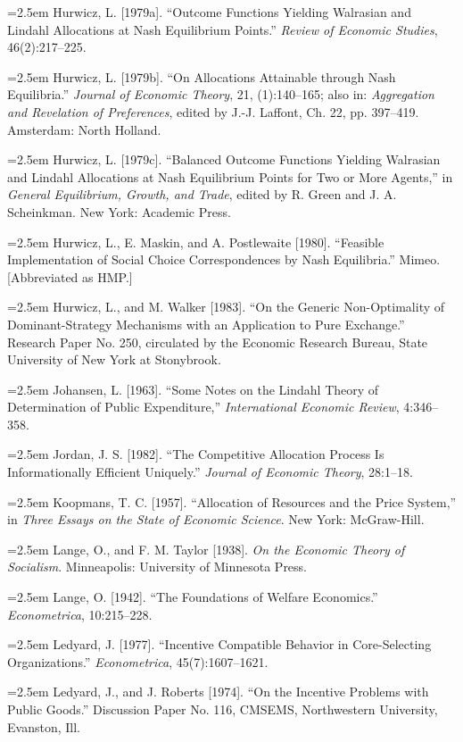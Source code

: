 \documentclass[12pt, letterpaper]{article}
\newcommand{\bibentry}[1]{\noindent\hangindent=2.5em\hangafter=1 \small #1 \par\vspace{0.75em}}
\begin{document}
\bibentry{Hurwicz, L. [1979a]. ``Outcome Functions Yielding Walrasian and Lindahl Allocations at Nash Equilibrium Points.'' \textit{Review of Economic Studies}, 46(2):217--225.}

\bibentry{Hurwicz, L. [1979b]. ``On Allocations Attainable through Nash Equilibria.'' \textit{Journal of Economic Theory}, 21, (1):140--165; also in: \textit{Aggregation and Revelation of Preferences}, edited by J.-J. Laffont, Ch. 22, pp. 397--419. Amsterdam: North Holland.}

\bibentry{Hurwicz, L. [1979c]. ``Balanced Outcome Functions Yielding Walrasian and Lindahl Allocations at Nash Equilibrium Points for Two or More Agents,'' in \textit{General Equilibrium, Growth, and Trade}, edited by R. Green and J. A. Scheinkman. New York: Academic Press.}

\bibentry{Hurwicz, L., E. Maskin, and A. Postlewaite [1980]. ``Feasible Implementation of Social Choice Correspondences by Nash Equilibria.'' Mimeo. [Abbreviated as HMP.]}

\bibentry{Hurwicz, L., and M. Walker [1983]. ``On the Generic Non-Optimality of Dominant-Strategy Mechanisms with an Application to Pure Exchange.'' Research Paper No. 250, circulated by the Economic Research Bureau, State University of New York at Stonybrook.}

\bibentry{Johansen, L. [1963]. ``Some Notes on the Lindahl Theory of Determination of Public Expenditure,'' \textit{International Economic Review}, 4:346--358.}

\bibentry{Jordan, J. S. [1982]. ``The Competitive Allocation Process Is Informationally Efficient Uniquely.'' \textit{Journal of Economic Theory}, 28:1--18.}

\bibentry{Koopmans, T. C. [1957]. ``Allocation of Resources and the Price System,'' in \textit{Three Essays on the State of Economic Science}. New York: McGraw-Hill.}

\bibentry{Lange, O., and F. M. Taylor [1938]. \textit{On the Economic Theory of Socialism}. Minneapolis: University of Minnesota Press.}

\bibentry{Lange, O. [1942]. ``The Foundations of Welfare Economics.'' \textit{Econometrica}, 10:215--228.}

\bibentry{Ledyard, J. [1977]. ``Incentive Compatible Behavior in Core-Selecting Organizations.'' \textit{Econometrica}, 45(7):1607--1621.}

\bibentry{Ledyard, J., and J. Roberts [1974]. ``On the Incentive Problems with Public Goods.'' Discussion Paper No. 116, CMSEMS, Northwestern University, Evanston, Ill.}
\end{document}
